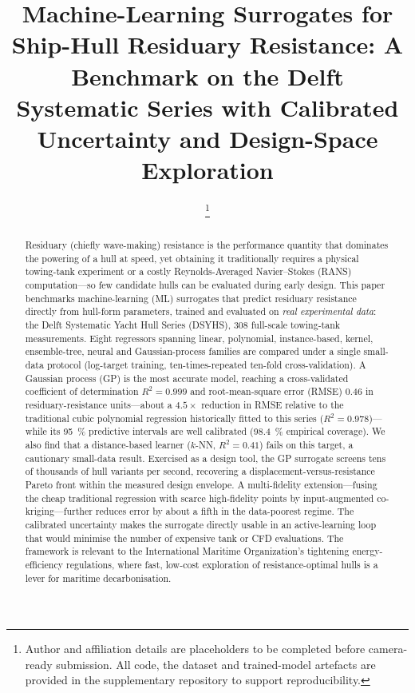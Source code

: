 \documentclass[conference]{IEEEtran}
\begin{document}
\title{Machine-Learning Surrogates for Ship-Hull Residuary Resistance:
A Benchmark on the Delft Systematic Series with Calibrated Uncertainty and
Design-Space Exploration}

\author{
\thanks{Author and affiliation details are placeholders to be completed before
camera-ready submission. All code, the dataset and trained-model artefacts are
provided in the supplementary repository to support reproducibility.}}

\maketitle

\begin{abstract}
Residuary (chiefly wave-making) resistance is the performance quantity that
dominates the powering of a hull at speed, yet obtaining it traditionally
requires a physical towing-tank experiment or a costly Reynolds-Averaged
Navier--Stokes (RANS) computation---so few candidate hulls can be evaluated
during early design. This paper benchmarks machine-learning (ML) surrogates that
predict residuary resistance directly from hull-form parameters, trained and
evaluated on \emph{real experimental data}: the Delft Systematic Yacht Hull
Series (DSYHS), \num{308} full-scale towing-tank measurements. Eight regressors
spanning linear, polynomial, instance-based, kernel, ensemble-tree, neural and
Gaussian-process families are compared under a single small-data protocol
(log-target training, ten-times-repeated ten-fold cross-validation). A Gaussian
process (GP) is the most accurate model, reaching a cross-validated coefficient
of determination $R^{2}=\num{0.999}$ and root-mean-square error (RMSE)
\num{0.46} in residuary-resistance units---about a $4.5\times$ reduction in RMSE
relative to the traditional cubic polynomial regression historically fitted to
this series ($R^{2}=\num{0.978}$)---while its \SI{95}{\percent} predictive
intervals are well calibrated (\SI{98.4}{\percent} empirical coverage). We also
find that a distance-based learner ($k$-NN, $R^{2}=\num{0.41}$) fails on this
target, a cautionary small-data result. Exercised as a design tool, the GP
surrogate screens tens of thousands of hull variants per second, recovering a
displacement-versus-resistance Pareto front within the measured design envelope.
A multi-fidelity extension---fusing the cheap traditional regression with scarce
high-fidelity points by input-augmented co-kriging---further reduces error by
about a fifth in the data-poorest regime. The calibrated uncertainty makes the
surrogate directly usable in an active-learning loop that would minimise the
number of expensive tank or CFD evaluations. The framework is relevant to the International Maritime
Organization's tightening energy-efficiency regulations, where fast, low-cost
exploration of resistance-optimal hulls is a lever for maritime decarbonisation.
\end{abstract}
\end{document}
